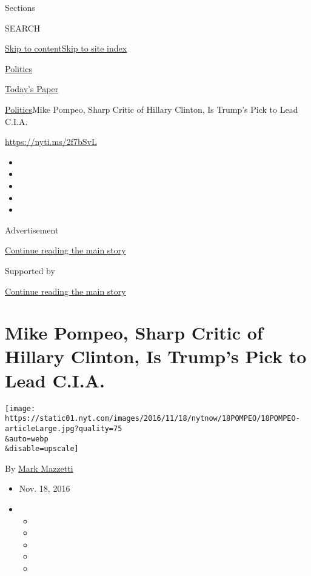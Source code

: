 Sections

SEARCH

\protect\hyperlink{site-content}{Skip to
content}\protect\hyperlink{site-index}{Skip to site index}

\href{https://www.nytimes.com/section/politics}{Politics}

\href{https://myaccount.nytimes.com/auth/login?response_type=cookie\&client_id=vi}{}

\href{https://www.nytimes.com/section/todayspaper}{Today's Paper}

\href{/section/politics}{Politics}\textbar{}Mike Pompeo, Sharp Critic of
Hillary Clinton, Is Trump's Pick to Lead C.I.A.

\url{https://nyti.ms/2f7bSvL}

\begin{itemize}
\item
\item
\item
\item
\item
\end{itemize}

Advertisement

\protect\hyperlink{after-top}{Continue reading the main story}

Supported by

\protect\hyperlink{after-sponsor}{Continue reading the main story}

\hypertarget{mike-pompeo-sharp-critic-of-hillary-clinton-is-trumps-pick-to-lead-cia}{%
\section{Mike Pompeo, Sharp Critic of Hillary Clinton, Is Trump's Pick
to Lead
C.I.A.}\label{mike-pompeo-sharp-critic-of-hillary-clinton-is-trumps-pick-to-lead-cia}}

\texttt{[image: https://static01.nyt.com/images/2016/11/18/nytnow/18POMPEO/18POMPEO-articleLarge.jpg?quality=75\\\&auto=webp\\\&disable=upscale]}

By \href{http://www.nytimes.com/by/mark-mazzetti}{Mark Mazzetti}

\begin{itemize}
\item
  Nov. 18, 2016
\item
  \begin{itemize}
  \item
  \item
  \item
  \item
  \item
  \end{itemize}
\end{itemize}

